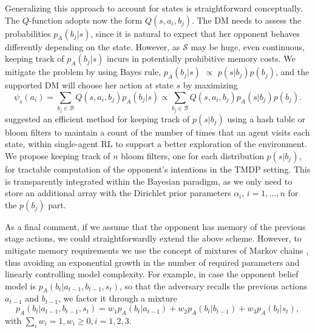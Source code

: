Generalizing this approach to account for states is straightforward
conceptually.
The $Q$-function adopts now the form $Q(s, a_i, b_j)$. The DM needs to assess the probabilities $p_A(b_j | s)$,
since it is natural to expect that her opponent behaves differently depending
on the state.
However, as $\mathcal{S}$ may be huge, even continuous, keeping track of $p_A(b_j|s)$ 
incurs in potentially prohibitive memory costs. 
We mitigate the 
problem by using 
Bayes rule, $p_{A}(b_j| s) \,\, \propto \,\, p(s| b_j)p(b_j)$, 
and the supported DM will choose her action at state $s$ by maximizing
\[ \psi_s(a_i) = \sum_{b_j \in \mathcal{B}} Q(s, a_i, b_j) p_{A}(b_j|s)
\propto 
\sum_{b_j \in \mathcal{B}} Q(s, a_i, b_j) p_{A}(s | b_j) p (b_j ).  \]
  \textcite{tang2017exploration} suggested an efficient method for keeping track of $p(s| b_j)$ using a hash table or bloom filters to maintain a count of the number of times that an agent visits each state, within single-agent RL to support a better exploration of the environment. We propose keeping 
  track of $n$ bloom filters, one for each
distribution $p(s|b_j)$, for tractable computation of the opponent's intentions
in the TMDP setting. This is transparently integrated
within the Bayesian paradigm, as we only need to store an additional array with the Dirichlet prior parameters $\alpha_i$, $i=1,\ldots, n$ for the $p(b_j)$ part. %

As a final comment, if we assume that the opponent has memory of the previous stage actions, we could straightforwardly extend the above scheme. However,
to mitigate memory requirements we use the concept of
mixtures of Markov chains \parencite{raftery1985model},
thus avoiding an exponential growth in 
the number of required parameters and linearly controlling 
model complexity.
For example,
in case the opponent belief model
is $p_{A}(b_t | a_{t-1}, b_{t-1}, s_t)$, so that the adversary recalls 
 the previous actions $a_{t-1}$ and $b_{t-1}$, we 
 factor it through a mixture 
\[
p_{A}(b_t | a_{t-1}, b_{t-1}, s_t) = w_1 p_{A}(b_t | a_{t-1})  + w_2 p_{A}(b_t | b_{t-1})
 + w_3 p_{A}(b_t | s_t),
 \] 
 with $\sum_i w_i = 1, w_i \geq 0, i=1,2,3$.
 
